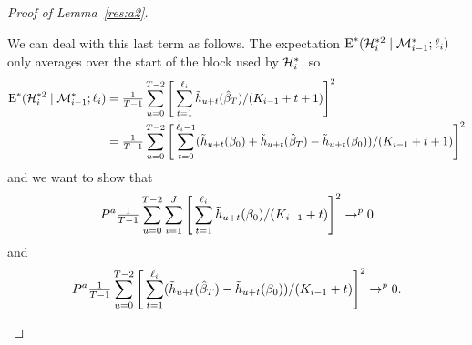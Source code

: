 \documentclass[12pt,fleqn]{article}
\begin{document}
\begin{proof}[Proof of Lemma~\ref{res:a2}]
\begin{enumerate}
    We can deal with this last term as follows. The expectation
    $\operatorname{E}^*(\mathcal{H}_i^{*2} \mid \mathcal{M}_{i-1}^*; \ell_i)$ only averages over the
    start of the block used by $\mathcal{H}_i^*$, so
    \begin{align*}
      \E^*(\Hs_i^{*2} \mid \Ms_{i-1}^*; \ell_i)
      &= \tfrac{1}{T-1} \sum_{u = 0}^{T-2} \Bigg[\sum_{t = 1}^{\ell_{i}} \tilde{h}_{u + t}(\btrue[*]) / (K_{i-1} + t + 1)\Bigg]^2 \\
      &= \tfrac{1}{T-1} \sum_{u = 0}^{T-2} \Bigg[\sum_{t = 0}^{\ell_{i}-1}
      (\tilde{h}_{u + t}(\btrue) + \tilde{h}_{u + t}(\btrue[*]) - \tilde{h}_{u + t}(\btrue))/ (K_{i-1} + t + 1)\Bigg]^2
    \end{align*}
    and we want to show that
    \begin{equation}\label{eq:4}
      P^a \tfrac{1}{T-1} \sum_{u = 0}^{T-2} \sum_{i=1}^J \Bigg[\sum_{t = 1}^{\ell_{i}}
      \tilde{h}_{u + t}(\btrue)/ (K_{i-1} + t)\Bigg]^2 \to^p 0
    \end{equation}
    and
    \begin{equation}\label{eq:5}
      P^a \tfrac{1}{T-1} \sum_{u = 0}^{T-2} \Bigg[\sum_{t = 1}^{\ell_{i}}
      (\tilde{h}_{u + t}(\btrue[*]) - \tilde{h}_{u + t}(\btrue))/ (K_{i-1} + t)\Bigg]^2
      \to^p 0.
    \end{equation}


\end{enumerate}
\end{proof}
\end{document}
